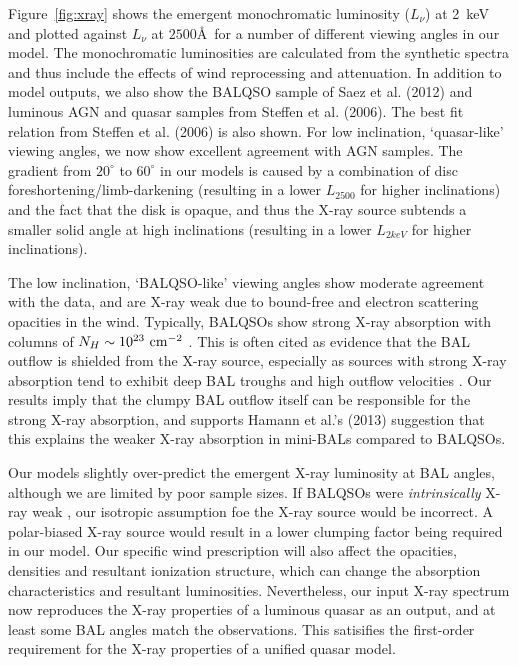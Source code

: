 \documentclass[preprint, a4paper, 11pt]{aastex}
\begin{document}
Figure~\ref{fig:xray} shows the emergent
monochromatic luminosity ($L_\nu$) at 2~keV and 
plotted against $L_\nu$ at $2500$\AA\ for a number of different viewing angles in our model.
The monochromatic luminosities are calculated from the synthetic spectra and thus include
the effects of wind reprocessing and attenuation. In addition to model outputs,
we also show the BALQSO sample of Saez et al. (2012) and luminous AGN and quasar
samples from Steffen et al. (2006). The best fit relation from Steffen et al. (2006) 
is also shown. For low inclination, `quasar-like' viewing angles,
we now show excellent agreement with AGN samples. The gradient from $20^\circ$ to
$60^\circ$ in our models is caused by a combination of disc foreshortening/limb-darkening 
(resulting in a lower $L_{2500}$ for higher inclinations) and the fact that the disk 
is opaque, and thus the X-ray source subtends a smaller solid angle at high inclinations
(resulting in a lower $L_{2keV}$ for higher inclinations). 



The low inclination, `BALQSO-like' viewing angles show moderate agreement with the data,
and are X-ray weak due to bound-free and electron scattering opacities in the wind.
Typically, BALQSOs show strong X-ray absorption with columns 
of $N_H\sim10^{23}~\rm{cm^{-2}}$ 
\citep{green1996,mathur2000,green2001,grupemathur2003}.
This is often cited as evidence that the BAL outflow is shielded from
the X-ray source, especially as sources with strong X-ray absorption tend
to exhibit deep BAL troughs and high outflow velocities 
\citep{brandt2000,laorbrandt2002,gallagher2006}.
Our results imply that the clumpy BAL outflow
itself can be responsible for the strong X-ray absorption, 
and supports Hamann et al.'s (2013) suggestion that 
this explains the weaker X-ray absorption in mini-BALs 
compared to BALQSOs.

Our models slightly over-predict the emergent X-ray luminosity at BAL angles, 
although we are limited by poor sample sizes. 
If BALQSOs were {\em intrinsically} 
X-ray weak \citep[as suggested by, e.g.][]{morabito2013},
our isotropic assumption foe the X-ray source would be incorrect. 
A polar-biased X-ray source would result in a lower clumping factor being
required in our model. Our specific wind
prescription will also affect the opacities, densities and resultant
ionization structure, which can change the absorption characteristics and resultant
luminosities.
Nevertheless, our input X-ray spectrum
now reproduces the X-ray properties of a luminous quasar as an output,
and at least some BAL angles match the observations.
This satisifies the first-order requirement for the X-ray properties of 
a unified quasar model.
\end{document}
